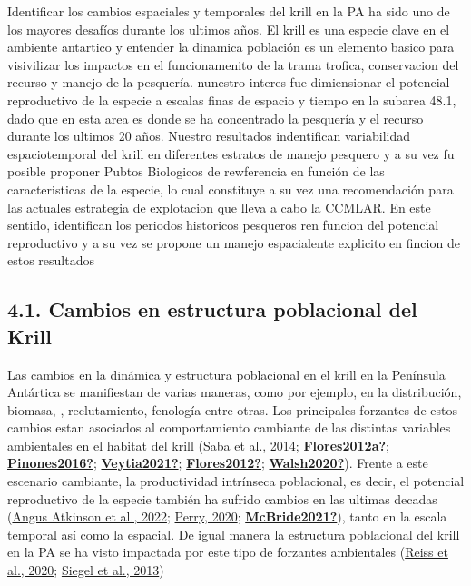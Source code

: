 \documentclass[
]{article}
\begin{document}
Identificar los cambios espaciales y temporales del krill en la PA ha
sido uno de los mayores desafíos durante los ultimos años. El krill es
una especie clave en el ambiente antartico y entender la dinamica
población es un elemento basico para visivilizar los impactos en el
funcionamenito de la trama trofica, conservacion del recurso y manejo de
la pesquería. nunestro interes fue dimiensionar el potencial
reproductivo de la especie a escalas finas de espacio y tiempo en la
subarea 48.1, dado que en esta area es donde se ha concentrado la
pesquería y el recurso durante los ultimos 20 años. Nuestro resultados
indentifican variabilidad espaciotemporal del krill en diferentes
estratos de manejo pesquero y a su vez fu posible proponer Pubtos
Biologicos de rewferencia en función de las caracteristicas de la
especie, lo cual constituye a su vez una recomendación para las actuales
estrategia de explotacion que lleva a cabo la CCMLAR. En este sentido,
identifican los periodos historicos pesqueros ren funcion del potencial
reproductivo y a su vez se propone un manejo espacialente explicito en
fincion de estos resultados

\hypertarget{cambios-en-estructura-poblacional-del-krill}{%
\subsection{4.1. Cambios en estructura poblacional del
Krill}\label{cambios-en-estructura-poblacional-del-krill}}

Las cambios en la dinámica y estructura poblacional en el krill en la
Península Antártica se manifiestan de varias maneras, como por ejemplo,
en la distribución, biomasa, , reclutamiento, fenología entre otras. Los
principales forzantes de estos cambios estan asociados al comportamiento
cambiante de las distintas variables ambientales en el habitat del krill
(\protect\hyperlink{ref-Saba2014}{Saba et al., 2014};
\protect\hyperlink{ref-Flores2012a}{\textbf{Flores2012a?}};
\protect\hyperlink{ref-Pinones2016}{\textbf{Pinones2016?}};
\protect\hyperlink{ref-Veytia2021}{\textbf{Veytia2021?}};
\protect\hyperlink{ref-Flores2012}{\textbf{Flores2012?}};
\protect\hyperlink{ref-Walsh2020}{\textbf{Walsh2020?}}). Frente a este
escenario cambiante, la productividad intrínseca poblacional, es decir,
el potencial reproductivo de la especie también ha sufrido cambios en
las ultimas decadas (\protect\hyperlink{ref-Atkinson2022}{Angus Atkinson
et al., 2022}; \protect\hyperlink{ref-Perry2020}{Perry, 2020};
\protect\hyperlink{ref-McBride2021}{\textbf{McBride2021?}}), tanto en la
escala temporal así como la espacial. De igual manera la estructura
poblacional del krill en la PA se ha visto impactada por este tipo de
forzantes ambientales (\protect\hyperlink{ref-Reiss2020}{Reiss et al.,
2020}; \protect\hyperlink{ref-Siegel2013}{Siegel et al., 2013})
\end{document}
